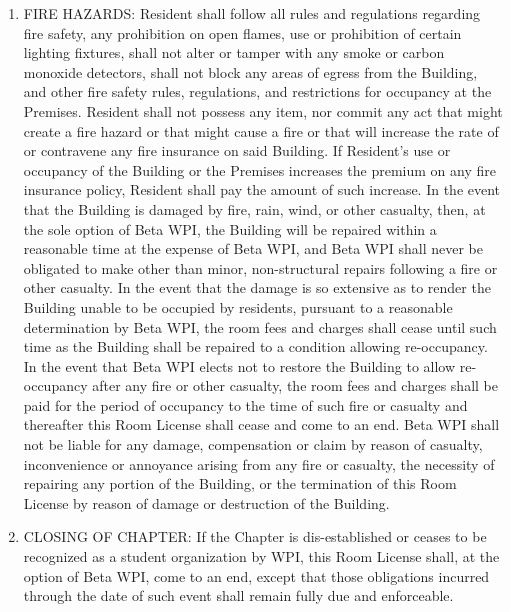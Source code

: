 \documentclass[legalpaper, 12pt]{article}
\begin{document}
\begin{enumerate}
        \item\label{itm:fire} FIRE HAZARDS\@: Resident shall follow all rules
                and regulations regarding fire safety, any prohibition on open
                flames, use or prohibition of certain lighting fixtures, shall
                not alter or tamper with any smoke or carbon monoxide
                detectors, shall not block any areas of egress from the
                Building, and other fire safety rules, regulations, and
                restrictions for occupancy at the Premises.  Resident shall not
                possess any item, nor commit any act that might create a fire
                hazard or that might cause a fire or that will increase the
                rate of or contravene any fire insurance on said Building.  If
                Resident’s use or occupancy of the Building or the Premises
                increases the premium on any fire insurance policy, Resident
                shall pay the amount of such increase.  In the event that the
                Building is damaged by fire, rain, wind, or other casualty,
                then, at the sole option of Beta WPI, the Building will be
                repaired within a reasonable time at the expense of Beta WPI,
                and Beta WPI shall never be obligated to make other than minor,
                non-structural repairs following a fire or other casualty.  In
                the event that the damage is so extensive as to render the
                Building unable to be occupied by residents, pursuant to a
                reasonable determination by Beta WPI, the room fees and charges
                shall cease until such time as the Building shall be repaired
                to a condition allowing re-occupancy.  In the event that Beta
                WPI elects not to restore the Building to allow re-occupancy
                after any fire or other casualty, the room fees and charges
                shall be paid for the period of occupancy to the time of such
                fire or casualty and thereafter this Room License shall cease
                and come to an end.  Beta WPI shall not be liable for any
                damage, compensation or claim by reason of casualty,
                inconvenience or annoyance arising from any fire or casualty,
                the necessity of repairing any portion of the Building, or the
                termination of this Room License by reason of damage or
                destruction of the Building.

        \item\label{itm:closing} CLOSING OF CHAPTER\@: If the Chapter is
                dis-established or ceases to be recognized as a student
                organization by WPI, this Room License shall, at the option of
                Beta WPI, come to an end, except that those obligations
                incurred through the date of such event shall remain fully due
                and enforceable.


\end{enumerate}
\end{document}
